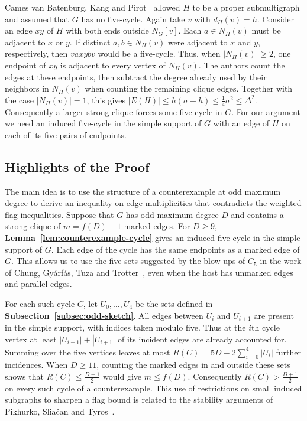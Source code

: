 \documentclass[preprint,11pt,numbers]{elsarticle-arxiv}
\numberwithin{equation}{section}
\theoremstyle{definition}
\begin{document}
Cames van Batenburg, Kang and Pirot~\cite{CamesKangPirot2020}
allowed $H$ to be a proper submultigraph and assumed that $G$ has
no five-cycle. Again take $v$ with $d_H(v)=h$. Consider an edge
$xy$ of $H$ with both ends outside $N_G[v]$. Each $a\in N_H(v)$
must be adjacent to $x$ or $y$. If distinct $a,b\in N_H(v)$
were adjacent to $x$ and $y$, respectively, then $vaxybv$ would
be a five-cycle. Thus, when $|N_H(v)|\geq2$, one endpoint of $xy$
is adjacent to every vertex of $N_H(v)$. The authors count the
edges at these endpoints, then subtract the degree already used by
their neighbors in $N_H(v)$ when counting the remaining clique edges.
Together with the case $|N_H(v)|=1$, this gives
$|E(H)|\leq h(\sigma-h)\leq\frac{1}{4}\sigma^2\leq\Delta^2$.
Consequently a larger strong clique forces some five-cycle in $G$.
For our argument we need an induced five-cycle in the simple support
of $G$ with an edge of $H$ on each of its five pairs of endpoints.

\subsection{Highlights of the Proof}\label{subsec:method-highlights}

The main idea is to use the structure of a counterexample at odd
maximum degree to derive an inequality on edge multiplicities that
contradicts the weighted flag inequalities. Suppose that $G$ has odd
maximum degree $D$ and contains a strong clique of $m=f(D)+1$ marked edges.
For $D\geq9$, \textbf{Lemma~\ref{lem:counterexample-cycle}} gives an
induced five-cycle in the simple support of $G$. Each edge of the cycle
has the same endpoints as a marked edge of $G$. This allows us to
use the five sets suggested by the blow-ups of $C_5$ in the work
of Chung, Gy\'arf\'as, Tuza and Trotter~\cite{CGTT1990}, even when
the host has unmarked edges and parallel edges.

For each such cycle $C$, let $U_0,\ldots,U_4$ be the sets defined
in \textbf{Subsection~\ref{subsec:odd-sketch}}. All edges between
$U_i$ and $U_{i+1}$ are present in the simple support, with indices
taken modulo five. Thus at the $i$th cycle vertex at least
$|U_{i-1}|+|U_{i+1}|$ of its incident edges are already accounted for.
Summing over the five vertices leaves at most
$R(C)=5D-2\sum_{i=0}^4|U_i|$ further incidences.
When $D\geq11$, counting the marked edges in and outside these
sets shows that $R(C)\leq\frac{D+1}{2}$ would give $m\leq f(D)$.
Consequently $R(C)>\frac{D+1}{2}$ on every such cycle of a
counterexample. This use of restrictions on small induced subgraphs
to sharpen a flag bound is related to the stability arguments of
Pikhurko, Slia\v{c}an and Tyros~\cite{PikhurkoSliacanTyros2019}.
\end{document}

